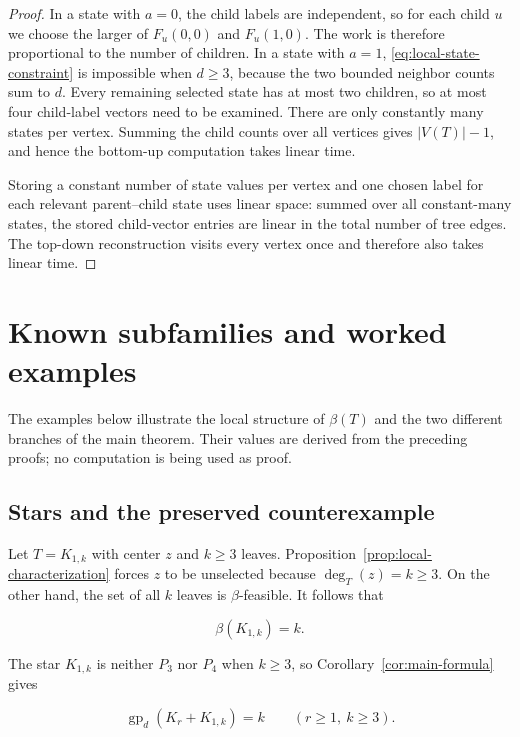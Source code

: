 \documentclass[11pt,a4paper]{article}
\numberwithin{equation}{section}
\begin{document}
\begin{proof}
In a state with \(a=0\), the child labels are
independent, so for each child \(u\) we choose the larger of
\(F_u(0,0)\) and \(F_u(1,0)\). The work is therefore proportional to the
number of children. In a state with \(a=1\), \eqref{eq:local-state-constraint} is impossible when
\(d\ge 3\), because the two bounded neighbor counts sum to \(d\). Every
remaining selected state has at most two children, so at most four
child-label vectors need to be examined. There are only constantly many
states per vertex. Summing the child counts over all vertices gives
\(|V(T)|-1\), and hence the bottom-up computation takes linear time.

Storing a constant number of state values per vertex and one chosen
label for each relevant parent--child state uses linear space: summed
over all constant-many states, the stored child-vector entries are
linear in the total number of tree edges. The
top-down reconstruction visits every vertex once and therefore also
takes linear time.
\end{proof}

\section{Known subfamilies and worked examples}\label{sec:examples}

The examples below illustrate the local structure of \(\beta(T)\) and
the two different branches of the main theorem. Their values are derived
from the preceding proofs; no computation is being used as proof.

\subsection{Stars and the preserved counterexample}\label{sec:stars}

Let \(T=K_{1,k}\) with center \(z\) and \(k\ge 3\) leaves.
Proposition~\ref{prop:local-characterization} forces \(z\) to be
unselected because \(\deg_T(z)=k\ge 3\). On the
other hand, the set of all \(k\) leaves is \(\beta\)-feasible. It
follows that

\[
\beta(K_{1,k})=k.
\]

The star \(K_{1,k}\) is neither \(P_3\) nor \(P_4\) when \(k\ge 3\), so
Corollary~\ref{cor:main-formula} gives

\begin{equation}\label{eq:star-family}
\operatorname{gp}_d(K_r+K_{1,k})=k
\qquad (r\ge 1,\ k\ge 3).
\end{equation}
\end{document}
